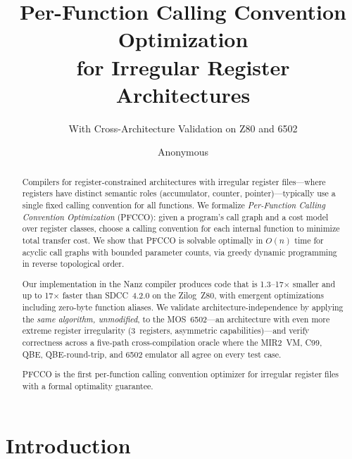 \documentclass[sigplan,screen,nonacm]{acmart}
\begin{document}
\title{Per-Function Calling Convention Optimization\\for Irregular Register Architectures}
\subtitle{With Cross-Architecture Validation on Z80 and 6502}

\author{Anonymous}

\begin{abstract}
Compilers for register-constrained architectures with irregular register
files---where registers have distinct semantic roles (accumulator, counter,
pointer)---typically use a single fixed calling convention for all functions.
We formalize \emph{Per-Function Calling Convention Optimization} (PFCCO):
given a program's call graph and a cost model over register classes, choose
a calling convention for each internal function to minimize total transfer
cost.  We show that PFCCO is solvable optimally in $O(n)$ time for acyclic
call graphs with bounded parameter counts, via greedy dynamic programming in
reverse topological order.

Our implementation in the Nanz compiler produces code that is
1.3--17$\times$ smaller and up to 17$\times$ faster than SDCC~4.2.0 on
the Zilog~Z80, with emergent optimizations including zero-byte function
aliases.  We validate architecture-independence by applying the \emph{same
algorithm, unmodified}, to the MOS~6502---an architecture with even more
extreme register irregularity (3~registers, asymmetric capabilities)---and
verify correctness across a five-path cross-compilation oracle where the
MIR2~VM, C99, QBE, QBE-round-trip, and 6502 emulator all agree on every
test case.

PFCCO is the first per-function calling convention optimizer for irregular
register files with a formal optimality guarantee.
\end{abstract}


\maketitle

\section{Introduction}
\label{sec:intro}
\end{document}
